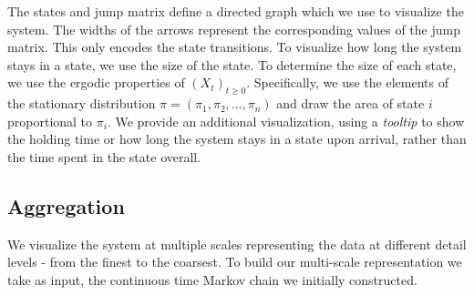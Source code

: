 The states and jump matrix define a directed graph which we use to visualize the system. The widths of the arrows represent the corresponding values of the jump matrix. This only encodes the state transitions. To visualize how long the system stays in a state, we use the size of the state.
To determine the size of each state, we use the ergodic properties of $(X_t)_{t \ge 0}$. Specifically,
we use the elements of the stationary distribution $\pi = (\pi_1, \pi_2, ..., \pi_n)$ and draw the area of
state $i$ proportional to $\pi_i$. %
We provide an additional visualization, using a \emph{tooltip} to show the holding time or how long the system stays in a state upon arrival, rather than the time spent in the state overall.


\subsection{Aggregation}
\label{sec:framework-aggregation}

We visualize the system at multiple scales  representing
the data at different detail levels - from the finest to the coarsest. To build our multi-scale representation we take as input, the continuous time Markov chain we initially constructed. 


